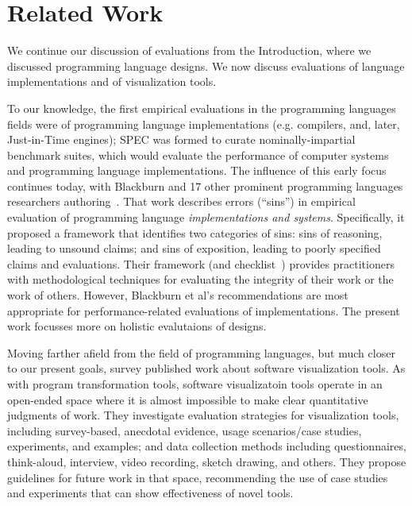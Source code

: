\section{Related Work}
\label{sec:related}
We continue our discussion of evaluations from the Introduction, where we 
discussed programming language designs. We now
discuss evaluations of language implementations and of visualization
tools.

To our knowledge, the first empirical evaluations in the programming
languages fields were of programming language implementations
(e.g. compilers, and, later, Just-in-Time engines); 
SPEC was formed to curate nominally-impartial benchmark suites,
which would evaluate the performance of
computer systems and programming language implementations. 
The influence of this early focus continues
today, with Blackburn and 17 other prominent programming languages
researchers
authoring~\cite{blackburn16:_truth_whole_truth_nothin_but_truth}. That
work describes errors (``sins'') in empirical evaluation of programming
language \emph{implementations and systems}.  Specifically, it proposed a
framework that identifies two categories of sins: sins of reasoning,
leading to unsound claims; and sins of exposition, leading to poorly
specified claims and evaluations. Their framework (and 
checklist~\cite{berger19:_check_manif_empir_evaluat}) provides
practitioners with methodological techniques for evaluating the
integrity of their work or the work of others.  However, Blackburn et al's
recommendations are most appropriate for
performance-related evaluations of implementations. 
The present work focusses more on holistic
evalutaions of designs.

Moving farther afield from the field of programming languages, but
much closer to our present goals,
 survey
published work about software visualization tools. As with
program transformation tools, software visualizatoin tools operate in
an open-ended space where it is almost impossible to make clear
quantitative judgments of work. They investigate evaluation strategies
for visualization tools, including survey-based, anecdotal evidence,
usage scenarios/case studies, experiments, and examples; and data
collection methods including questionnaires, think-aloud, interview,
video recording, sketch drawing, and others. They propose guidelines
for future work in that space, recommending the use of case studies
and experiments that can show effectiveness of novel tools.




